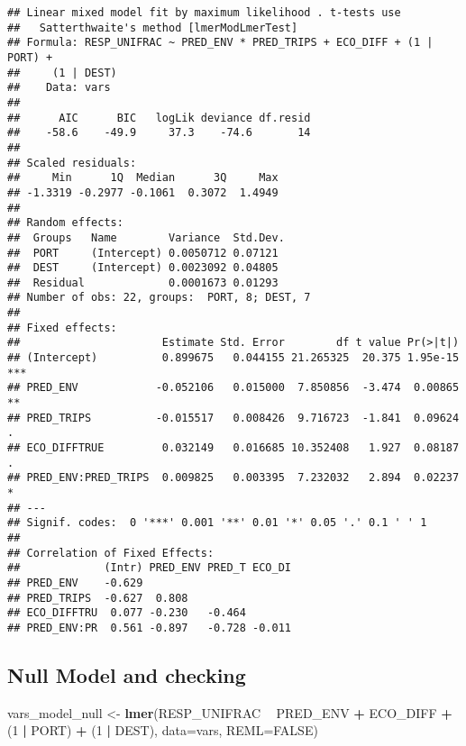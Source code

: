 \documentclass[]{article}
\newenvironment{Shaded}{\begin{snugshade}}{\end{snugshade}}
\newcommand{\KeywordTok}[1]{\textcolor[rgb]{0.13,0.29,0.53}{\textbf{#1}}}
\newcommand{\DataTypeTok}[1]{\textcolor[rgb]{0.13,0.29,0.53}{#1}}
\newcommand{\DecValTok}[1]{\textcolor[rgb]{0.00,0.00,0.81}{#1}}
\newcommand{\StringTok}[1]{\textcolor[rgb]{0.31,0.60,0.02}{#1}}
\newcommand{\OtherTok}[1]{\textcolor[rgb]{0.56,0.35,0.01}{#1}}
\newcommand{\OperatorTok}[1]{\textcolor[rgb]{0.81,0.36,0.00}{\textbf{#1}}}
\newcommand{\NormalTok}[1]{#1}
\begin{document}
\begin{verbatim}
## Linear mixed model fit by maximum likelihood . t-tests use
##   Satterthwaite's method [lmerModLmerTest]
## Formula: RESP_UNIFRAC ~ PRED_ENV * PRED_TRIPS + ECO_DIFF + (1 | PORT) +  
##     (1 | DEST)
##    Data: vars
## 
##      AIC      BIC   logLik deviance df.resid 
##    -58.6    -49.9     37.3    -74.6       14 
## 
## Scaled residuals: 
##     Min      1Q  Median      3Q     Max 
## -1.3319 -0.2977 -0.1061  0.3072  1.4949 
## 
## Random effects:
##  Groups   Name        Variance  Std.Dev.
##  PORT     (Intercept) 0.0050712 0.07121 
##  DEST     (Intercept) 0.0023092 0.04805 
##  Residual             0.0001673 0.01293 
## Number of obs: 22, groups:  PORT, 8; DEST, 7
## 
## Fixed effects:
##                      Estimate Std. Error        df t value Pr(>|t|)    
## (Intercept)          0.899675   0.044155 21.265325  20.375 1.95e-15 ***
## PRED_ENV            -0.052106   0.015000  7.850856  -3.474  0.00865 ** 
## PRED_TRIPS          -0.015517   0.008426  9.716723  -1.841  0.09624 .  
## ECO_DIFFTRUE         0.032149   0.016685 10.352408   1.927  0.08187 .  
## PRED_ENV:PRED_TRIPS  0.009825   0.003395  7.232032   2.894  0.02237 *  
## ---
## Signif. codes:  0 '***' 0.001 '**' 0.01 '*' 0.05 '.' 0.1 ' ' 1
## 
## Correlation of Fixed Effects:
##             (Intr) PRED_ENV PRED_T ECO_DI
## PRED_ENV    -0.629                       
## PRED_TRIPS  -0.627  0.808                
## ECO_DIFFTRU  0.077 -0.230   -0.464       
## PRED_ENV:PR  0.561 -0.897   -0.728 -0.011
\end{verbatim}

\subsection{Null Model and checking}\label{null-model-and-checking}

\begin{Shaded}
\begin{Highlighting}[]
\NormalTok{vars_model_null <-}\StringTok{ }\KeywordTok{lmer}\NormalTok{(RESP_UNIFRAC }\OperatorTok{~}\StringTok{ }\NormalTok{PRED_ENV }\OperatorTok{+}\StringTok{ }\NormalTok{ECO_DIFF }\OperatorTok{+}\StringTok{ }\NormalTok{(}\DecValTok{1} \OperatorTok{|}\StringTok{ }\NormalTok{PORT) }\OperatorTok{+}\StringTok{ }\NormalTok{(}\DecValTok{1} \OperatorTok{|}\StringTok{ }\NormalTok{DEST), }\DataTypeTok{data=}\NormalTok{vars, }\DataTypeTok{REML=}\OtherTok{FALSE}\NormalTok{)}
\end{Highlighting}
\end{Shaded}
\end{document}

